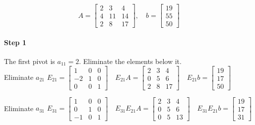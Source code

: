 \begin{examplex}
    \[
        A =
        \begin{bmatrix}
            2 & 3  & 4  \\
            4 & 11 & 14 \\
            2 & 8  & 17
        \end{bmatrix},
        \quad
        b =
        \begin{bmatrix}
            19 \\ 55 \\ 50
        \end{bmatrix}
    \]

    \paragraph{Step 1}
    The first pivot is $a_{11} = 2$. Eliminate the elements below it. \\
    \vspace{0.4cm}
    Eliminate $a_{21}$ \qquad
    $
        E_{21} =
        \begin{bmatrix}
            1  & 0 & 0 \\
            -2 & 1 & 0 \\
            0  & 0 & 1
        \end{bmatrix}
        \quad
        E_{21}A =
        \begin{bmatrix}
            2 & 3 & 4  \\
            0 & 5 & 6  \\
            2 & 8 & 17
        \end{bmatrix}
        \quad
        E_{21}b =
        \begin{bmatrix}
            19 \\ 17 \\ 50
        \end{bmatrix}
    $

    \vspace{0.4cm}
    Eliminate $a_{31}$ \qquad
    $
        E_{31} =
        \begin{bmatrix}
            1  & 0 & 0 \\
            0  & 1 & 0 \\
            -1 & 0 & 1
        \end{bmatrix}
        \quad
        E_{31}E_{21}A =
        \begin{bmatrix}
            2 & 3 & 4  \\
            0 & 5 & 6  \\
            0 & 5 & 13
        \end{bmatrix}
        \quad
        E_{31}E_{21}b =
        \begin{bmatrix}
            19 \\ 17 \\ 31
        \end{bmatrix}
    $


\end{examplex}
